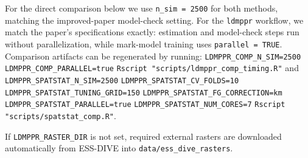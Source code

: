 \documentclass[a4paper]{report}
\begin{document}
\begin{article}
For the direct comparison below we use \texttt{n\_sim = 2500} for both
methods, matching the improved-paper model-check setting. For the
\texttt{ldmppr} workflow, we match the paper's specifications exactly:
estimation and model-check steps run without parallelization, while
mark-model training uses \texttt{parallel = TRUE}. Comparison artifacts
can be regenerated by running: \newline
\texttt{LDMPPR\_COMP\_N\_SIM=2500} \newline
\texttt{LDMPPR\_COMP\_PARALLEL=true} \newline
\texttt{Rscript "scripts/ldmppr\_comp\_timing.R"} and \newline
\texttt{LDMPPR\_SPATSTAT\_N\_SIM=2500} \newline
\texttt{LDMPPR\_SPATSTAT\_CV\_FOLDS=10} \newline
\texttt{LDMPPR\_SPATSTAT\_TUNING\_GRID=150} \newline
\texttt{LDMPPR\_SPATSTAT\_FG\_CORRECTION=km} \newline
\texttt{LDMPPR\_SPATSTAT\_PARALLEL=true} \newline
\texttt{LDMPPR\_SPATSTAT\_NUM\_CORES=7} \newline
\texttt{Rscript "scripts/spatstat\_comp.R"}.

If \texttt{LDMPPR\_RASTER\_DIR} is not set, required external rasters
are downloaded automatically from ESS-DIVE into
\texttt{data/ess\_dive\_rasters}.


\end{article}
\end{document}
